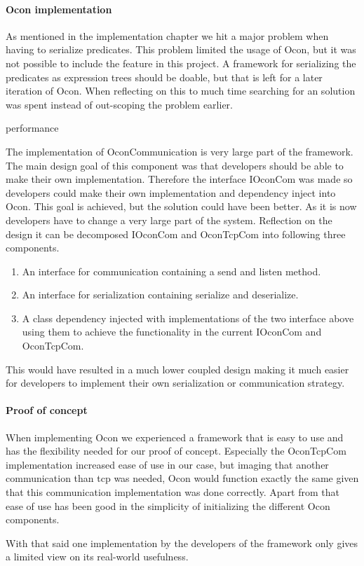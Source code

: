 \documentclass[../report.tex]{subfiles}
\begin{document}
\graphicspath{{img/}{../img/}}


\paragraph{Ocon implementation}
As mentioned in the implementation chapter we hit a major problem when having to serialize predicates. This problem limited the usage of Ocon, but it was not possible to include the feature in this project. A framework for serializing the predicates as expression trees should be doable, but that is left for a later iteration of Ocon. When reflecting on this to much time searching for an solution was spent instead of out-scoping the problem earlier. 

performance

The implementation of OconCommunication is very large part of the framework. The main design goal of this component was that developers should be able to make their own implementation. Therefore the interface IOconCom was made so developers could make their own implementation and dependency inject into Ocon. This goal is achieved, but the solution could have been better. As it is now developers have to change a very large part of the system. Reflection on the design it can be decomposed IOconCom and OconTcpCom into following three components.

\begin{enumerate}
\item An interface for communication containing a send and listen method.
\item An interface for serialization containing serialize and deserialize.
\item A class dependency injected with implementations of the two interface above using them to achieve the functionality in the current IOconCom and OconTcpCom.
\end{enumerate}

This would have resulted in a much lower coupled design making it much easier for developers to implement their own serialization or communication strategy.

\paragraph{Proof of concept}
When implementing Ocon we experienced a framework that is easy to use and has the flexibility needed for our proof of concept. Especially the OconTcpCom implementation increased ease of use in our case, but imaging that another communication than tcp was needed, Ocon would function exactly the same given that this communication implementation was done correctly. Apart from that ease of use has been good in the simplicity of initializing the different Ocon components.

With that said one implementation by the developers of the framework only gives a limited view on its real-world usefulness.
\end{document}
